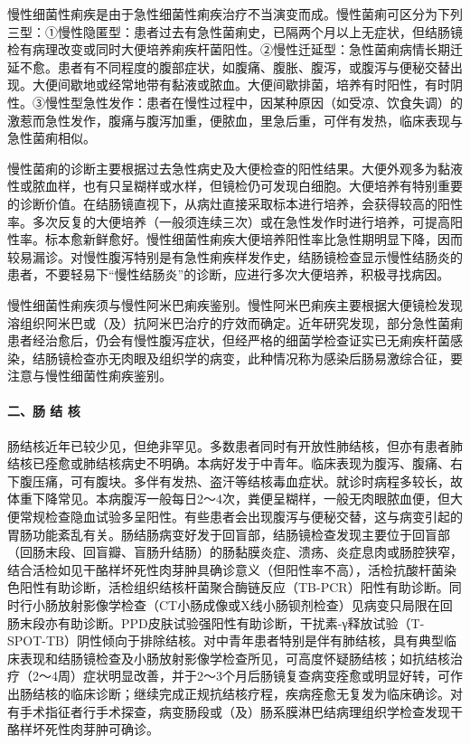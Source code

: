 慢性细菌性痢疾是由于急性细菌性痢疾治疗不当演变而成。慢性菌痢可区分为下列三型：①慢性隐匿型：患者过去有急性菌痢史，已隔两个月以上无症状，但结肠镜检有病理改变或同时大便培养痢疾杆菌阳性。②慢性迁延型：急性菌痢病情长期迁延不愈。患者有不同程度的腹部症状，如腹痛、腹胀、腹泻，或腹泻与便秘交替出现。大便间歇地或经常地带有黏液或脓血。大便间歇排菌，培养有时阳性，有时阴性。③慢性型急性发作：患者在慢性过程中，因某种原因（如受凉、饮食失调）的激惹而急性发作，腹痛与腹泻加重，便脓血，里急后重，可伴有发热，临床表现与急性菌痢相似。

慢性菌痢的诊断主要根据过去急性病史及大便检查的阳性结果。大便外观多为黏液性或脓血样，也有只呈糊样或水样，但镜检仍可发现白细胞。大便培养有特别重要的诊断价值。在结肠镜直视下，从病灶直接采取标本进行培养，会获得较高的阳性率。多次反复的大便培养（一般须连续三次）或在急性发作时进行培养，可提高阳性率。标本愈新鲜愈好。慢性细菌性痢疾大便培养阳性率比急性期明显下降，因而较易漏诊。对慢性腹泻特别是有急性痢疾样发作史，结肠镜检查显示慢性结肠炎的患者，不要轻易下“慢性结肠炎”的诊断，应进行多次大便培养，积极寻找病因。

慢性细菌性痢疾须与慢性阿米巴痢疾鉴别。慢性阿米巴痢疾主要根据大便镜检发现溶组织阿米巴或（及）抗阿米巴治疗的疗效而确定。近年研究发现，部分急性菌痢患者经治愈后，仍会有慢性腹泻症状，但经严格的细菌学检查证实已无痢疾杆菌感染，结肠镜检查亦无肉眼及组织学的病变，此种情况称为感染后肠易激综合征，要注意与慢性细菌性痢疾鉴别。

\paragraph{二、肠 结 核}

肠结核近年已较少见，但绝非罕见。多数患者同时有开放性肺结核，但亦有患者肺结核已痊愈或肺结核病史不明确。本病好发于中青年。临床表现为腹泻、腹痛、右下腹压痛，可有腹块。多伴有发热、盗汗等结核毒血症状。就诊时病程多较长，故体重下降常见。本病腹泻一般每日2～4次，粪便呈糊样，一般无肉眼脓血便，但大便常规检查隐血试验多呈阳性。有些患者会出现腹泻与便秘交替，这与病变引起的胃肠功能紊乱有关。肠结肠病变好发于回盲部，结肠镜检查发现主要位于回盲部（回肠末段、回盲瓣、盲肠升结肠）的肠黏膜炎症、溃疡、炎症息肉或肠腔狭窄，结合活检如见干酪样坏死性肉芽肿具确诊意义（但阳性率不高），活检抗酸杆菌染色阳性有助诊断，活检组织结核杆菌聚合酶链反应（TB-PCR）阳性有助诊断。同时行小肠放射影像学检查（CT小肠成像或X线小肠钡剂检查）见病变只局限在回肠末段亦有助诊断。PPD皮肤试验强阳性有助诊断，干扰素-γ释放试验（T-SPOT-TB）阴性倾向于排除结核。对中青年患者特别是伴有肺结核，具有典型临床表现和结肠镜检查及小肠放射影像学检查所见，可高度怀疑肠结核；如抗结核治疗（2～4周）症状明显改善，并于2～3个月后肠镜复查病变痊愈或明显好转，可作出肠结核的临床诊断；继续完成正规抗结核疗程，疾病痊愈无复发为临床确诊。对有手术指征者行手术探查，病变肠段或（及）肠系膜淋巴结病理组织学检查发现干酪样坏死性肉芽肿可确诊。

